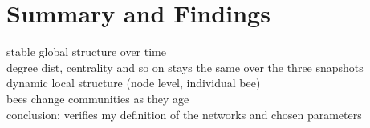 \section{Summary and Findings}

stable global structure over time\\
degree dist, centrality and so on stays the same over the three snapshots\\
dynamic local structure (node level, individual bee)\\
bees change communities as they age\\
conclusion: verifies my definition of the networks and chosen parameters\\